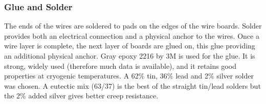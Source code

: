 \subsubsection{Glue and Solder}
The ends of the wires are soldered to pads on the edges of the wire boards.  Solder provides both an electrical connection and a physical anchor to the wires. Once a wire layer is complete, the next layer of boards are glued on, this glue providing an additional physical anchor. Gray epoxy 2216 by 3M is used for the glue.  It is strong, widely used (therefore much data is available), and it retains good properties at cryogenic temperatures.  A 62$\%$ tin, 36$\%$ lead and 2$\%$ silver solder was chosen.  A eutectic mix (63/37) is the best of the straight tin/lead solders but the 2$\%$ added silver gives better creep resistance.

